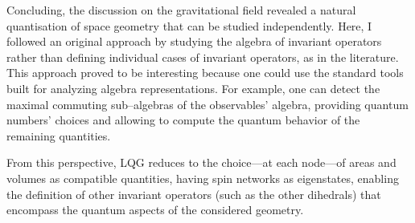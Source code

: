 Concluding, the discussion on the gravitational field revealed a natural quantisation of space geometry that can be studied independently. Here, I followed an original approach by studying the algebra of invariant operators rather than defining individual cases of invariant operators, as in the literature. This approach proved to be interesting because one could use the standard tools built for analyzing algebra representations. For example, one can detect the maximal commuting sub--algebras of the observables' algebra, providing quantum numbers' choices and allowing to compute the quantum behavior of the remaining quantities.

From this perspective, LQG reduces to the choice---at each node---of areas and volumes as compatible quantities, having spin networks as eigenstates, enabling the definition of other invariant operators (such as the other dihedrals) that encompass the quantum aspects of the considered geometry.




